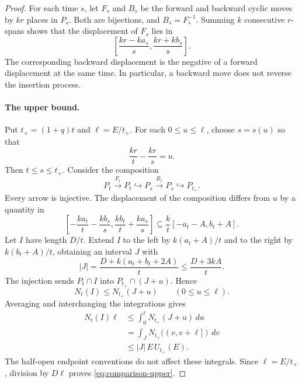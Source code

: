 \documentclass[11pt]{article}
\theoremstyle{remark}
\numberwithin{equation}{section}
\begin{document}
\begin{proof}
For each time $s$, let $F_s$ and $B_s$ be the forward and backward cyclic
moves by $kr$ places in $P_s$. Both are bijections, and $B_s=F_s^{-1}$.
Summing $k$ consecutive $r$-spans shows that the displacement of $F_s$
lies in
\[
  \left[\frac{kr-ka_s}{s},\frac{kr+kb_s}{s}\right].
\]
The corresponding backward displacement is the negative of a forward
displacement at the same time. In particular, a backward move does not
reverse the insertion process.
\paragraph{The upper bound.}
Put $t_+=(1+q)t$ and $\ell=E/t_+$. For each $0\leq u\leq\ell$, choose
$s=s(u)$ so that
\[
  \frac{kr}{t}-\frac{kr}{s}=u.
\]
Then $t\leq s\leq t_+$. Consider the composition
\[
  P_t\xrightarrow{F_t}P_t
  \hookrightarrow P_s\xrightarrow{B_s}P_s
  \hookrightarrow P_{t_+}.
\]
Every arrow is injective. The displacement of the composition differs
from $u$ by a quantity in
\[
  \left[-\frac{ka_t}{t}-\frac{kb_s}{s},
         \frac{kb_t}{t}+\frac{ka_s}{s}\right]
  \subseteq\frac{k}{t}[-a_t-A,b_t+A].
\]
Let $I$ have length $D/t$. Extend $I$ to the left by $k(a_t+A)/t$ and to
the right by $k(b_t+A)/t$, obtaining an interval $J$ with
\[
  |J|=\frac{D+k(a_t+b_t+2A)}{t}\leq\frac{D+3kA}{t}.
\]
The injection sends $P_t\cap I$ into $P_{t_+}\cap(J+u)$. Hence
\[
  N_t(I)\leq N_{t_+}(J+u)
  \qquad(0\leq u\leq\ell).
\]
Averaging and interchanging the integrations gives
\[
  \begin{aligned}
    N_t(I)\ell
    &\leq\int_0^\ell N_{t_+}(J+u)\,du\\
    &=\int_J N_{t_+}((v,v+\ell])\,dv\\
    &\leq |J|\,E\,U_{t_+}(E).
  \end{aligned}
\]
The half-open endpoint conventions do not affect these integrals.
Since $\ell=E/t_+$, division by $D\ell$ proves
\eqref{eq:comparison-upper}.

\end{proof}
\end{document}
